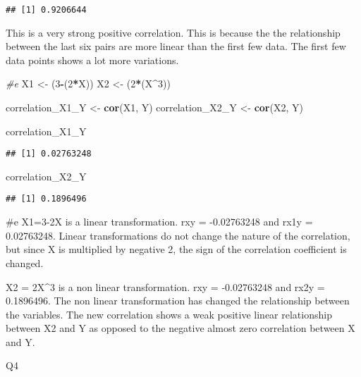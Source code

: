 \documentclass[
]{article}
\newenvironment{Shaded}{\begin{snugshade}}{\end{snugshade}}
\newcommand{\CommentTok}[1]{\textcolor[rgb]{0.56,0.35,0.01}{\textit{#1}}}
\newcommand{\DecValTok}[1]{\textcolor[rgb]{0.00,0.00,0.81}{#1}}
\newcommand{\FunctionTok}[1]{\textcolor[rgb]{0.13,0.29,0.53}{\textbf{#1}}}
\newcommand{\NormalTok}[1]{#1}
\newcommand{\OtherTok}[1]{\textcolor[rgb]{0.56,0.35,0.01}{#1}}
\newcommand{\SpecialCharTok}[1]{\textcolor[rgb]{0.81,0.36,0.00}{\textbf{#1}}}
\begin{document}
\begin{verbatim}
## [1] 0.9206644
\end{verbatim}

This is a very strong positive correlation. This is because the the
relationship between the last six pairs are more linear than the first
few data. The first few data points shows a lot more variations.

\begin{Shaded}
\begin{Highlighting}[]
\CommentTok{\#e}
\NormalTok{X1 }\OtherTok{\textless{}{-}}\NormalTok{ (}\DecValTok{3}\SpecialCharTok{{-}}\NormalTok{(}\DecValTok{2}\SpecialCharTok{*}\NormalTok{X))}
\NormalTok{X2 }\OtherTok{\textless{}{-}}\NormalTok{ (}\DecValTok{2}\SpecialCharTok{*}\NormalTok{(X}\SpecialCharTok{\^{}}\DecValTok{3}\NormalTok{))}

\NormalTok{correlation\_X1\_Y }\OtherTok{\textless{}{-}} \FunctionTok{cor}\NormalTok{(X1, Y)}
\NormalTok{correlation\_X2\_Y }\OtherTok{\textless{}{-}} \FunctionTok{cor}\NormalTok{(X2, Y)}

\NormalTok{correlation\_X1\_Y}
\end{Highlighting}
\end{Shaded}

\begin{verbatim}
## [1] 0.02763248
\end{verbatim}

\begin{Shaded}
\begin{Highlighting}[]
\NormalTok{correlation\_X2\_Y}
\end{Highlighting}
\end{Shaded}

\begin{verbatim}
## [1] 0.1896496
\end{verbatim}

\#e X1=3-2X is a linear transformation. rxy = -0.02763248 and rx1y =
0.02763248. Linear transformations do not change the nature of the
correlation, but since X is multiplied by negative 2, the sign of the
correlation coefficient is changed.

X2 = 2X\^{}3 is a non linear transformation. rxy = -0.02763248 and rx2y
= 0.1896496. The non linear transformation has changed the relationship
between the variables. The new correlation shows a weak positive linear
relationship between X2 and Y as opposed to the negative almost zero
correlation between X and Y.

Q4
\end{document}
